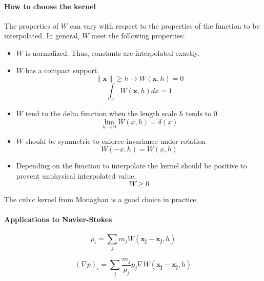 \paragraph{How to choose the kernel}
The properties of $W$ can vary with respect to the properties of the function to be interpolated. In general, $W$ meet the following properties:
\begin{itemize}
\item $W$ is normalized. Thus, constants are interpolated exactly.
\item $W$ has a compact support.
\begin{equation}
\parallel \mathbf{x} \parallel \geq h \rightarrow W(\mathbf{x},h) = 0 
\end{equation}
\begin{equation}
\int_{\mathcal{V}} W(\mathbf{x},h) dx = 1
\end{equation}
\item $W$ tend to the delta function when the length scale $h$ tends to $0$.
\begin{equation}
\lim_{h \rightarrow 0} W(x,h) = \delta(x)
\end{equation}
\item $W$ should be symmetric to enforce invariance under rotation
\begin{equation}
W(-x,h) = W(x,h)
\end{equation}
\item Depending on the function to interpolate the kernel should be positive to prevent unphysical interpolated value.
\begin{equation}
W \geq 0
\end{equation}
\end{itemize}

The cubic kernel from Monaghan is a good choice in practice.

\paragraph{Applications to Navier-Stokes}

\begin{equation}
\rho_{i} = \sum_{j} m_{j}W(\mathbf{x_{j}}-\mathbf{x_{j}},h)
\end{equation}

\begin{equation}
\left(\nabla p\right)_{i} = \sum_{j} \frac{m_{j}}{\rho_{j}} p_{j} \nabla W(\mathbf{x_{j}}-\mathbf{x_{j}},h)
\end{equation}

